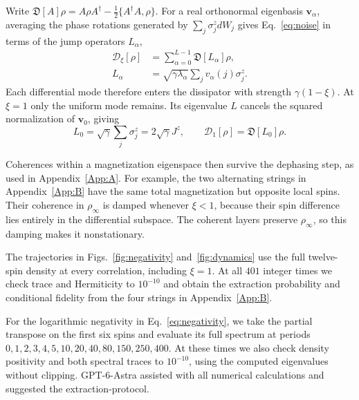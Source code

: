 \documentclass[aps,prl,reprint,amsmath,amssymb,floatfix,superscriptaddress]{revtex4-2}
\begin{document}
Write $\mathfrak D[A]\rho=A\rho A^\dagger-\tfrac12\{A^\dagger A,\rho\}$. For a real orthonormal eigenbasis $\bm v_\alpha$, averaging the phase rotations generated by $\sum_j\sigma_j^z dW_j$ gives Eq.~\eqref{eq:noise} in terms of the jump operators $L_\alpha$,
\begin{align}
\mathcal D_\xi[\rho]&=\sum_{\alpha=0}^{L-1}\mathfrak{D}[L_\alpha]\rho,
\nonumber\\
L_\alpha&=\sqrt{\gamma\lambda_\alpha}
\sum_j v_\alpha(j)\sigma_j^z.
\label{eq:noise_jumps}
\end{align}
Each differential mode therefore enters the dissipator with strength $\gamma(1-\xi)$. At $\xi=1$ only the uniform mode remains. Its eigenvalue $L$ cancels the squared normalization of $\bm v_0$, giving
\begin{equation}
L_0=\sqrt\gamma\sum_j\sigma_j^z=2\sqrt\gamma J^z,
\qquad \mathcal D_1[\rho]=\mathfrak D[L_0]\rho.
\label{eq:collective_jump}
\end{equation}
{ Coherences within a magnetization eigenspace then survive the dephasing step, as used in Appendix~\ref{App:A}. For example, the two alternating strings in Appendix~\ref{App:B} have the same total magnetization but opposite local spins. Their coherence in $\rho_\infty$ is damped whenever $\xi<1$, because their spin difference lies entirely in the differential subspace. The coherent layers preserve $\rho_\infty$, so this damping makes it nonstationary.\par}

\newpage
{}
The trajectories in Figs.~\ref{fig:negativity} and~\ref{fig:dynamics} use the full twelve-spin density at every correlation, including $\xi=1$. At all $401$ integer times we check trace and Hermiticity to $10^{-10}$ and obtain the extraction probability and conditional fidelity from the four strings in Appendix~\ref{App:B}.

For the logarithmic negativity in Eq.~\eqref{eq:negativity}, we take the partial transpose on the first six spins and evaluate its full spectrum at periods $0,1,2,3,4,5,10,20,40,80,150,250,400$. At these times we also check density positivity and both spectral traces to $10^{-10}$, using the computed eigenvalues without clipping. GPT-6-Astra assisted with all numerical calculations and suggested the extraction-protocol.
\end{document}
